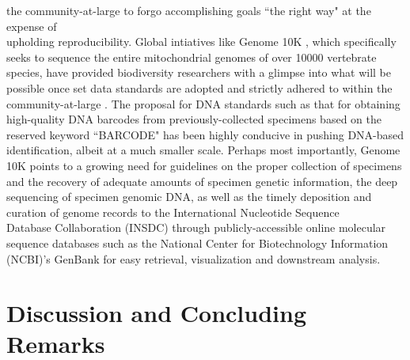 the community-at-large to forgo accomplishing goals ``the right way" at the expense of \\ upholding reproducibility. Global intiatives like Genome 10K \cite{G10KCOS2009genome, koepfli2015genome}, which specifically seeks to sequence the entire mitochondrial genomes of over 10000 vertebrate species, have provided biodiversity researchers with a glimpse into what will be possible once set data standards are adopted and strictly adhered to within the community-at-large \cite{koepfli2015genome}. The proposal for DNA standards such as that for obtaining high-quality DNA barcodes from previously-collected specimens based on the reserved keyword ``BARCODE" \cite{hanner2009data} has been highly conducive in pushing DNA-based identification, albeit at a much smaller scale. Perhaps most importantly, Genome 10K points to a growing need for guidelines on the proper collection of specimens and the recovery of adequate amounts of specimen genetic information, the deep sequencing of specimen genomic DNA, as well as the timely deposition and curation of genome records to the International Nucleotide Sequence \\ Database Collaboration (INSDC) through publicly-accessible online molecular sequence databases such as the National Center for Biotechnology Information (NCBI)'s GenBank for easy retrieval, visualization and downstream analysis. 
 



\section{Discussion and Concluding Remarks}

